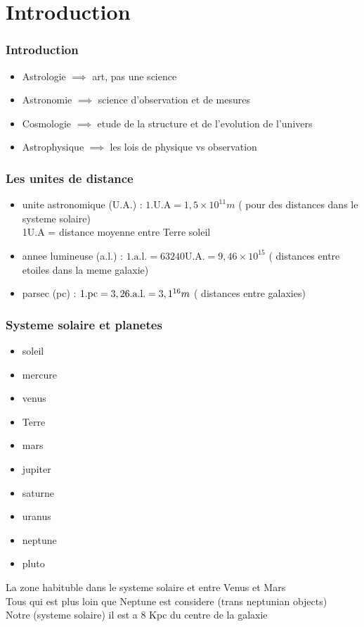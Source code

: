 \documentclass[12pt]{book}
\begin{document}
    \chapter{Introduction}
        \subsection{Introduction}
            \begin{itemize}
                \item Astrologie $ \implies $ art, pas une science
                \item Astronomie $ \implies $ science d'observation et de mesures 
                \item Cosmologie $ \implies $ etude de la structure et de l'evolution de l'univers
                \item Astrophysique $ \implies $ les lois de physique vs observation
            \end{itemize}
        \subsection{Les unites de distance}
            \begin{itemize}
                \item unite astronomique (U.A.) : $ 1.\text{U.A}=1,5\times 10^{11}m $ ( pour des distances dans le systeme solaire) \\
                    1U.A = distance moyenne entre Terre soleil
                \item annee lumineuse (a.l.) : $ 1.\text{a.l.} = 63240 \text{U.A.} = 9,46\times 10 ^{15} $ ( distances entre etoiles dans la meme galaxie)
                \item parsec (pc) : $ 1.\text{pc} = 3,26.\text{a.l.}=3,1\time 10^{16} m$ ( distances entre galaxies)
            \end{itemize}
        \pagebreak
        \subsection{Systeme solaire et planetes}
            \begin{itemize}
                \item soleil
                \item mercure
                \item venus
                \item Terre
                \item mars
                \item jupiter
                \item saturne 
                \item uranus
                \item neptune
                \item pluto
            \end{itemize}
            La zone habituble dans le systeme solaire et entre Venus et Mars \\ 
            Tous qui est plus loin que Neptune est considere (trans neptunian objects)\\
            Notre (systeme solaire) il est a 8 Kpc du centre de la galaxie
\end{document}
